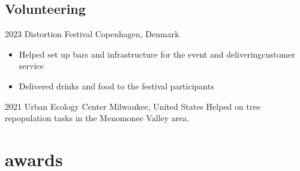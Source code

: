 \documentclass[]{friggeri-cv-a4}
\begin{document}
\subsection{Volunteering}

\begin{entrylist}


\entry
{2023}
{Distortion Festival}
{Copenhagen, Denmark}
{
\begin{itemize}
\item Helped set up bars and infrastructure for the event and deliveringcustomer service
\item Delivered drinks and food to the festival participants
\end{itemize}}


\entry
{2021}
{Urban Ecology Center}
{Milwaukee, United States}
{Helped on tree repopulation tasks in the Menomonee Valley area.}


\end{entrylist}


\section{awards}
\end{document}
